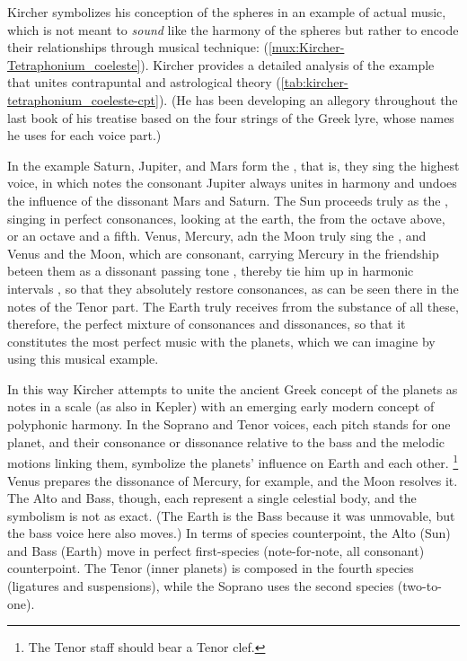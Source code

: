 Kircher symbolizes his conception of the spheres in an example of actual music,
which is not meant to \emph{sound} like the harmony of the spheres but rather to
encode their relationships through musical technique:
 (\cref{mux:Kircher-Tetraphonium_coeleste}).%
    \Autocite[bk. 2, 383]{Kircher:Musurgia}
Kircher provides a detailed analysis of the example that unites contrapuntal and
astrological theory (\cref{tab:kircher-tetraphonium_coeleste-cpt}).
(He has been developing an allegory throughout the last book of his treatise
based on the four strings of the Greek lyre, whose names he uses for each voice
part.)
\begin{quoting}
	In the example Saturn, Jupiter, and Mars form the , that
	is, they sing the highest voice, in which notes the consonant Jupiter
	always unites in harmony  and undoes the influence of
	 the dissonant Mars and Saturn.
	The Sun proceeds truly as the  , singing in
	perfect consonances, looking at the earth, the 
	 from the octave above, or an octave and a fifth.
	Venus, Mercury, adn the Moon truly sing the 
	, and Venus and the Moon, which are consonant, carrying
	Mercury in the friendship beteen them as a dissonant passing tone
	, thereby tie him up in harmonic
	intervals , so that they absolutely restore
	consonances, as can be seen there in the notes of the Tenor part.
	The Earth truly receives frrom the substance of all these, therefore,
	the perfect mixture of consonances and dissonances, so that it
        constitutes the most perfect music with the planets, which we can
        imagine by using this musical example.%
            \Autocite[bk. 2, 383--384]{Kircher:Musurgia}
\end{quoting}
In this way Kircher attempts to unite the ancient Greek concept of the planets
as notes in a scale (as also in Kepler) with an emerging early modern concept of
polyphonic harmony.
In the Soprano and Tenor voices, each pitch stands for one planet, and their
consonance or dissonance relative to the bass and the melodic motions linking
them, symbolize the planets' influence on Earth and each other.%
    \footnote{The Tenor staff should bear a Tenor clef.}
Venus prepares the dissonance of Mercury, for example, and the Moon resolves it.
The Alto and Bass, though, each represent a single celestial body, and the
symbolism is not as exact.
(The Earth is the Bass because it was unmovable, but the bass voice here also
moves.)
In terms of species counterpoint, the Alto (Sun) and Bass (Earth) move in
perfect first-species (note-for-note, all consonant) counterpoint.%
The Tenor (inner planets) is composed in the fourth species (ligatures and
suspensions), while the Soprano uses the second species (two-to-one).

